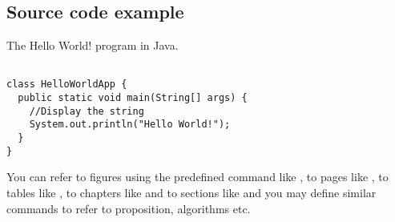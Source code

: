 \subsection{Source code example}

\begin{algorithm}[h]
  \caption{The Hello World! program in Java.}
  \label{hello_world}
  \begin{verbatim}
  
class HelloWorldApp {
  public static void main(String[] args) {
    //Display the string
    System.out.println("Hello World!");
  }
}
\end{verbatim}
\end{algorithm}

You can refer to figures using the predefined command like , to pages like , to tables like , to chapters like  and to sections like  and you may define similar commands to refer to proposition, algorithms etc.
